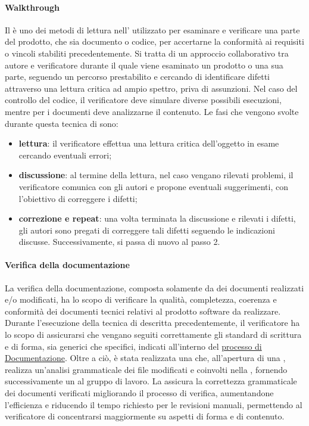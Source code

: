 \paragraph{Walkthrough}
Il  è uno dei metodi di lettura nell' utilizzato per esaminare e verificare una parte del prodotto, che sia documento o codice, per accertarne la conformità ai requisiti o vincoli stabiliti precedentemente.
Si tratta di un approccio collaborativo tra autore e verificatore durante il quale viene esaminato un prodotto o una sua parte, seguendo un percorso prestabilito e cercando di identificare difetti attraverso una lettura critica ad ampio spettro, priva di assunzioni.
Nel caso del controllo del codice, il verificatore deve simulare diverse possibili esecuzioni, mentre per i documenti deve analizzarne il contenuto.
Le fasi che vengono svolte durante questa tecnica di  sono:
\begin{itemize}
    \item \textbf{lettura}: il verificatore effettua una lettura critica dell'oggetto in esame cercando eventuali errori;
    \item \textbf{discussione}: al termine della lettura, nel caso vengano rilevati problemi, il verificatore comunica con gli autori e propone eventuali suggerimenti, con l'obiettivo di correggere i difetti;
    \item \textbf{correzione e repeat}: una volta terminata la discussione e rilevati i difetti, gli autori sono pregati di correggere tali difetti seguendo le indicazioni discusse. Successivamente, si passa di nuovo al passo 2.
\end{itemize}

\paragraph{Verifica della documentazione}
La verifica della documentazione, composta solamente da  dei documenti realizzati e/o modificati, ha lo scopo di verificare
la qualità, completezza, coerenza e conformità dei documenti tecnici relativi al prodotto software da realizzare.
Durante l'esecuzione della tecnica di  descritta precedentemente, il verificatore ha lo scopo di 
assicurarsi che vengano seguiti correttamente gli standard di scrittura e di forma, sia generici che specifici, indicati all'interno
del \hyperref[subsec:documentazione]{processo di Documentazione}.
Oltre a ciò, è stata realizzata una  che, all'apertura di una , realizza un'analisi grammaticale dei file 
modificati e coinvolti nella , fornendo successivamente un  al gruppo di lavoro.
La  assicura la correttezza grammaticale dei documenti verificati migliorando il processo di verifica, aumentandone l'efficienza 
e riducendo il tempo richiesto per le revisioni manuali, permettendo al verificatore di concentrarsi maggiormente su aspetti 
di forma e di contenuto.

